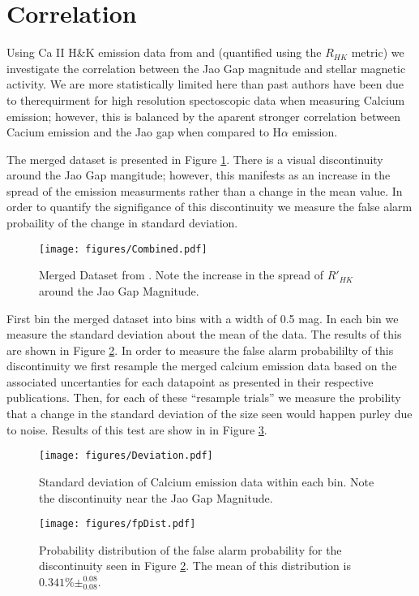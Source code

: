\section{Correlation}\label{sec:results}
Using Ca II H\&K emission data from \citet{Boudreaux2021} and
\citet{Perdelwitz2021} (quantified using the $R_{HK}$ metric) we investigate
the correlation between the Jao Gap magnitude and stellar magnetic activity. We
are more statistically limited here than past authors have been due to
therequirment for high resolution spectoscopic data when measuring Calcium
emission; however, this is balanced by the aparent stronger correlation between
Cacium emission and the Jao gap when compared to H$\alpha$ emission. 

The merged dataset is presented in Figure \ref{fig:mergedData}. There is a
visual discontinuity around the Jao Gap mangitude; however, this manifests as
an increase in the spread of the emission measurments rather than a change in
the mean value. In order to quantify the signifigance of this discontinuity we
measure the false alarm probaility of the change in standard deviation.

\begin{figure}
  \centering
  \texttt{[image: figures/Combined.pdf]}
  \caption{Merged Dataset from \citet{Boudreaux2021, Perdelwitz2021}. Note the
  increase in the spread of $R'_{HK}$ around the Jao Gap Magnitude.}
  \label{fig:mergedData}
\end{figure}

First bin the merged dataset into bins with a width of 0.5 mag. In each bin we
measure the standard deviation about the mean of the data. The results of this
are shown in Figure \ref{fig:deviation}. In order to measure the false alarm
probabililty of this discontinuity we first resample the merged calcium
emission data based on the associated uncertanties for each datapoint as
presented in their respective publications. Then, for each of these ``resample
trials'' we measure the probility that a change in the standard deviation of
the size seen would happen purley due to noise. Results of this test are show in
in Figure \ref{fig:dist}. 

\begin{figure}
  \centering
  \texttt{[image: figures/Deviation.pdf]}
  \caption{Standard deviation of Calcium emission data within each bin. Note
  the discontinuity near the Jao Gap Magnitude.}
  \label{fig:deviation}
\end{figure}

\begin{figure}
  \centering
  \texttt{[image: figures/fpDist.pdf]}
  \caption{Probability distribution of the false alarm probability for the
  discontinuity seen in Figure \ref{fig:deviation}. The mean of this
  distribution is $0.341\%\pm^{0.08}_{0.08}$.}
  \label{fig:dist}
\end{figure}
